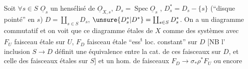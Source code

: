 Soit $\forall s\in S$ $\underline{O}_s$ un hensélisé de $\underline{O}_{X,s}$,
$D_s=\operatorname{Spec}\underline{O}_s$ , $D_s^{*}=D_s-\{s\}$  (``disque pointé'' en
$s$) $D=\coprod_{s\in S}D_s$, $\unsure{D_s^{*}|D^{*}}=\coprod_{s\in S}D_s^{*}$. On a
un diagramme commutatif
et on voit  que ce diagramme  
  étales de $X$ 
comme des systèmes  
avec $F_U$ faisceau étale sur $U$, $F_D$ faisceau
étale ``ess\textsuperscript{t} loc. constant'' sur $D$ [NB l'
inclusion $S\to D$ définit une équivalence
entre la cat. de ces faisceaux sur $D$, et
celle des faisceaux étales sur $S$] et
un hom. de faisceaux $F_D\to\sigma_{*}\rho^{*}F_U$ ou encore

